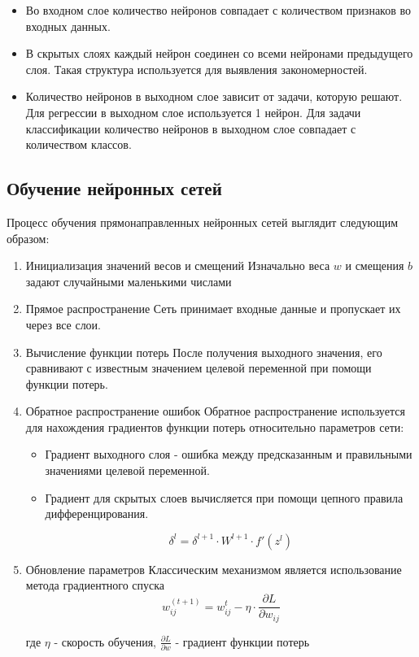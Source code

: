 \begin{itemize}
\item Во входном слое количество нейронов совпадает с количеством признаков во входных данных.
\item В скрытых слоях каждый нейрон соединен со всеми нейронами предыдущего слоя. Такая структура
используется для выявления закономерностей.
\item Количество нейронов в выходном слое зависит от задачи, которую решают. Для регрессии в выходном
слое используется 1 нейрон. Для задачи классификации количество нейронов в выходном слое совпадает
с количеством классов.
\end{itemize}
\subsection{Обучение нейронных сетей}

Процесс обучения прямонаправленных нейронных сетей выглядит следующим образом:
\begin{enumerate}
\item Инициализация значений весов и смещений
Изначально веса \(w\) и смещения \(b\) задают случайными маленькими числами
\item Прямое распространение
Сеть принимает входные данные и пропускает их через все слои.
\item Вычисление функции потерь
После получения выходного значения, его сравнивают с известным значением целевой переменной при
помощи функции потерь.
\item Обратное распространение ошибок
Обратное распространение используется для нахождения градиентов функции потерь относительно
параметров сети:
\begin{itemize}
\item Градиент выходного слоя - ошибка между предсказанным и правильными значениями целевой
переменной.
\item Градиент для скрытых слоев вычисляется при помощи цепного правила дифференцирования.

\begin{equation}
\delta^{l} = \delta^{l + 1} \cdot W^{l + 1} \cdot f'(z^{l})
\end{equation}
\end{itemize}

\item Обновление параметров
Классическим механизмом является использование метода градиентного спуска
\begin{equation}
w_{ij}^{(t+1)} = w_{ij}^{t} - \eta \cdot \frac{\partial L}{\partial w_{ij}}
\end{equation}

где \(\eta\) - скорость обучения, \(\frac{\partial L}{\partial w}\) - градиент функции потерь
\end{enumerate}


